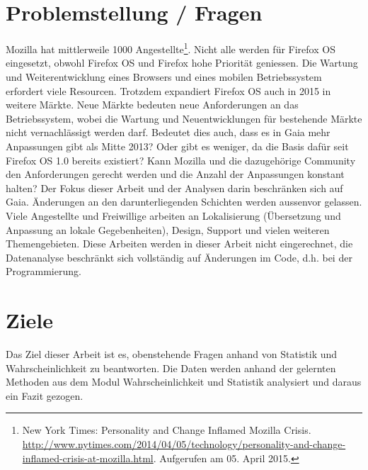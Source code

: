 \section{Problemstellung / Fragen}
Mozilla hat mittlerweile 1000 Angestellte\footnote{New York Times: Personality and Change Inflamed Mozilla Crisis. \url{http://www.nytimes.com/2014/04/05/technology/personality-and-change-inflamed-crisis-at-mozilla.html}. Aufgerufen am 05. April 2015.}. Nicht alle werden für Firefox OS eingesetzt, obwohl Firefox OS und Firefox hohe Priorität geniessen. Die Wartung und Weiterentwicklung eines Browsers und eines mobilen Betriebssystem erfordert viele Resourcen. Trotzdem expandiert Firefox OS auch in 2015 in weitere Märkte. Neue Märkte bedeuten neue Anforderungen an das Betriebssystem, wobei die Wartung und Neuentwicklungen für bestehende Märkte nicht vernachlässigt werden darf. Bedeutet dies auch, dass es in Gaia mehr Anpassungen gibt als Mitte 2013? Oder gibt es weniger, da die Basis dafür seit Firefox OS 1.0 bereits existiert? Kann Mozilla und die dazugehörige Community den Anforderungen gerecht werden und die Anzahl der Anpassungen konstant halten? Der Fokus dieser Arbeit und der Analysen darin beschränken sich auf Gaia. Änderungen an den darunterliegenden Schichten werden aussenvor gelassen. Viele Angestellte und Freiwillige arbeiten an Lokalisierung (Übersetzung und Anpassung an lokale Gegebenheiten), Design, Support und vielen weiteren Themengebieten. Diese Arbeiten werden in dieser Arbeit nicht eingerechnet, die Datenanalyse beschränkt sich vollständig auf Änderungen im Code, d.h. bei der Programmierung.

\section{Ziele}
Das Ziel dieser Arbeit ist es, obenstehende Fragen anhand von Statistik und Wahrscheinlichkeit zu beantworten. Die Daten werden anhand der gelernten Methoden aus dem Modul Wahrscheinlichkeit und Statistik analysiert und daraus ein Fazit gezogen.